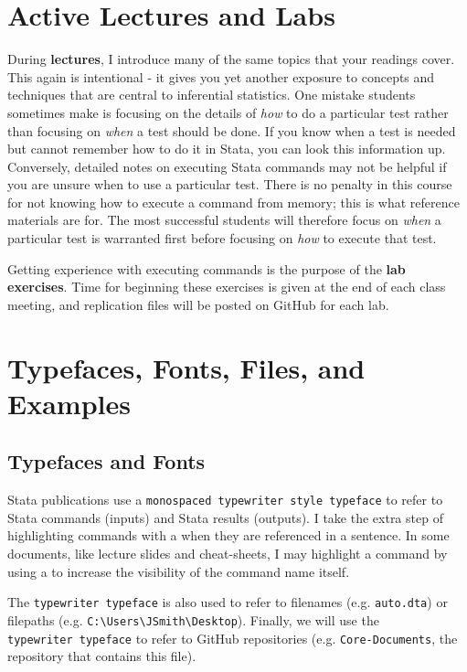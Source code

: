 \documentclass[]{book}
\begin{document}
\section{Active Lectures and Labs}\label{active-lectures-and-labs}

During \textbf{lectures}, I introduce many of the same topics that your
readings cover. This again is intentional - it gives you yet another
exposure to concepts and techniques that are central to inferential
statistics. One mistake students sometimes make is focusing on the
details of \emph{how} to do a particular test rather than focusing on
\emph{when} a test should be done. If you know when a test is needed but
cannot remember how to do it in Stata, you can look this information up.
Conversely, detailed notes on executing Stata commands may not be
helpful if you are unsure when to use a particular test. There is no
penalty in this course for not knowing how to execute a command from
memory; this is what reference materials are for. The most successful
students will therefore focus on \emph{when} a particular test is
warranted first before focusing on \emph{how} to execute that test.

Getting experience with executing commands is the purpose of the
\textbf{lab exercises}. Time for beginning these exercises is given at
the end of each class meeting, and replication files will be posted on
GitHub for each lab.

\section{Typefaces, Fonts, Files, and
Examples}\label{typefaces-fonts-files-and-examples}

\subsection{Typefaces and Fonts}\label{typefaces-and-fonts}

Stata publications use a
\texttt{monospaced\ typewriter\ style\ typeface} to refer to Stata
commands (inputs) and Stata results (outputs). I take the extra step of
highlighting commands with a when they are referenced in a sentence. In
some documents, like lecture slides and cheat-sheets, I may highlight a
command by using a to increase the visibility of the command name
itself.

The \texttt{typewriter\ typeface} is also used to refer to filenames
(e.g. \texttt{auto.dta}) or filepaths (e.g.
\texttt{C:\textbackslash{}Users\textbackslash{}JSmith\textbackslash{}Desktop}).
Finally, we will use the \texttt{typewriter\ typeface} to refer to
GitHub repositories (e.g. \texttt{Core-Documents}, the repository that
contains this file).
\end{document}
